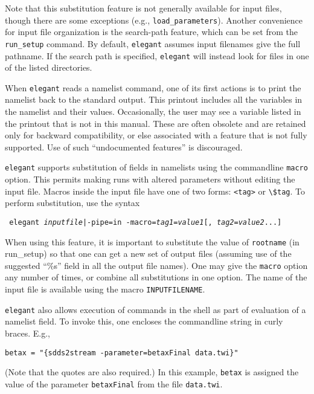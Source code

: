 \documentclass[11pt]{article}
\begin{document}
Note that this substitution feature is not generally available for
input files, though there are some exceptions (e.g., \verb|load_parameters|).
Another convenience for input file organization is the search-path feature,
which can be set from the \verb|run_setup| command.
By default, \verb|elegant| assumes input filenames give the full pathname.
If the search path is specified, \verb|elegant| will instead look for files in one of
the listed directories.

When {\tt elegant} reads a namelist command, one of its first actions
is to print the namelist back to the standard output.  This printout
includes all the variables in the namelist and their values.
Occasionally, the user may see a variable listed in the printout that
is not in this manual.  These are often obsolete and are retained only
for backward compatibility, or else associated with a feature that is
not fully supported.  Use of such ``undocumented features'' is
discouraged.

{\tt elegant} supports substitution of fields in namelists using the
commandline {\tt macro} option.  This permits making runs with altered
parameters without editing the input file.  Macros inside the input
file have one of two forms: \verb|<tag>| or \verb|\$tag|.  To perform
substitution, use the syntax
\begin{flushleft}{\tt
elegant {{\em inputfile}|-pipe=in} -macro={\em tag1}={\em value1}[,{\em
tag2}={\em value2}...]  }\end{flushleft} 
When using this feature, it
is important to substitute the value of {\tt rootname} (in run\_setup)
so that one can get a new set of output files (assuming use of the
suggested ``\%s'' field in all the output file names).
One may give the {\tt macro} option any number of times, or combine
all substitutions in one option.  The name of the input file is available
using the macro \verb|INPUTFILENAME|.

{\tt elegant} also allows execution of commands in the shell as part of
evaluation of a namelist field.  To invoke this, one encloses the commandline
string in curly braces.  E.g., 
\begin{verbatim}
betax = "{sdds2stream -parameter=betaxFinal data.twi}"
\end{verbatim}
(Note that the quotes are also required.)
In this example, \verb|betax| is assigned the value of the parameter {\tt betaxFinal} from
the file {\tt data.twi}.
\end{document}
